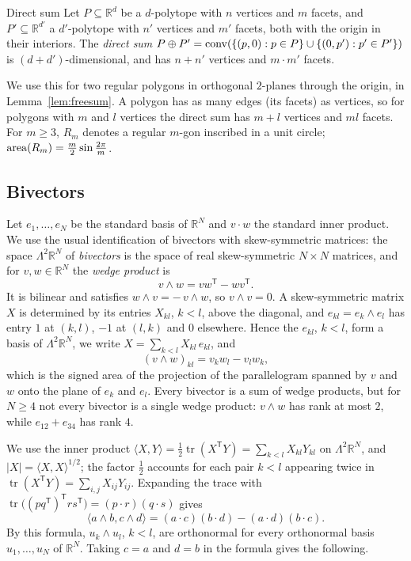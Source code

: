 \begin{cited}{Direct sum}{{\cite[Section~15.1.3]{henk-richter-gebert-ziegler-2017}}}
  Let $P \subseteq \mathbb{R}^{d}$ be a $d$-polytope with $n$ vertices and $m$
  facets, and $P' \subseteq \mathbb{R}^{d'}$ a $d'$-polytope with $n'$
  vertices and $m'$ facets, both with the origin in their interiors. The
  \emph{direct sum}
  $P \oplus P' = \operatorname{conv}(\{(p, 0) : p \in P\} \cup \{(0, p') : p' \in P'\})$ is
  $(d + d')$-dimensional, and has $n + n'$ vertices and $m \cdot m'$ facets.
\end{cited}

We use this for two regular polygons in orthogonal $2$-planes through the
origin, in Lemma~\ref{lem:freesum}. A polygon has as many edges (its facets)
as vertices, so for polygons with $m$ and $l$ vertices the direct sum has
$m + l$ vertices and $ml$ facets. For $m \geq 3$, $R_{m}$ denotes a regular
$m$-gon inscribed in a unit circle; $\operatorname{area}(R_{m}) = \frac{m}{2}\sin\frac{2\pi}{m}$.

\subsection{Bivectors}

Let $e_{1}, \ldots, e_{N}$ be the standard basis of $\mathbb{R}^{N}$ and
$v \cdot w$ the standard inner product. We use the usual identification of
bivectors with skew-symmetric matrices: the space $\Lambda^{2}\mathbb{R}^{N}$
of \emph{bivectors} is the space of real skew-symmetric $N \times N$ matrices,
and for $v, w \in \mathbb{R}^{N}$ the \emph{wedge product} is
\[
  v \wedge w = vw^{\mathsf{T}} - wv^{\mathsf{T}}.
\]
It is bilinear and satisfies $w \wedge v = -\,v \wedge w$, so $v \wedge v = 0$.
A skew-symmetric matrix $X$ is determined by its entries $X_{kl}$, $k < l$,
above the diagonal, and $e_{kl} = e_{k} \wedge e_{l}$ has entry $1$ at
$(k, l)$, $-1$ at $(l, k)$ and $0$ elsewhere. Hence the $e_{kl}$, $k < l$, form
a basis of $\Lambda^{2}\mathbb{R}^{N}$, we write
$X = \sum_{k<l} X_{kl}\, e_{kl}$, and
\[
  (v \wedge w)_{kl} = v_{k} w_{l} - v_{l} w_{k},
\]
which is the signed area of the projection of the parallelogram spanned by
$v$ and $w$ onto the plane of $e_{k}$ and $e_{l}$. Every bivector is a sum of
wedge products, but for $N \geq 4$ not every bivector is a single wedge
product: $v \wedge w$ has rank at most $2$, while $e_{12} + e_{34}$ has
rank $4$.

We use the inner product
$\langle X, Y\rangle = \frac12\operatorname{tr}(X^{\mathsf{T}}Y)
= \sum_{k<l} X_{kl}Y_{kl}$ on $\Lambda^{2}\mathbb{R}^{N}$, and
$|X| = \langle X, X\rangle^{1/2}$; the factor $\frac12$ accounts for each pair
$k < l$ appearing twice in $\operatorname{tr}(X^{\mathsf{T}}Y) = \sum_{i,j}
X_{ij}Y_{ij}$. Expanding the trace with
$\operatorname{tr}\bigl((pq^{\mathsf{T}})^{\mathsf{T}} rs^{\mathsf{T}}\bigr)
= (p \cdot r)(q \cdot s)$ gives
\[
  \langle a \wedge b, c \wedge d\rangle = (a \cdot c)(b \cdot d) - (a \cdot d)(b \cdot c).
\]
By this formula, $u_{k} \wedge u_{l}$, $k < l$, are orthonormal for every
orthonormal basis $u_{1}, \ldots, u_{N}$ of $\mathbb{R}^{N}$. Taking $c = a$
and $d = b$ in the formula gives the following.

